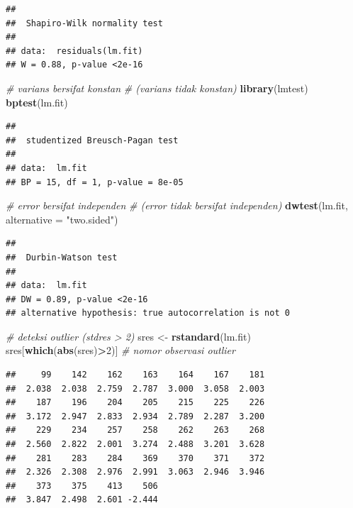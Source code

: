\documentclass[
]{book}
\newenvironment{Shaded}{\begin{snugshade}}{\end{snugshade}}
\newcommand{\AttributeTok}[1]{\textcolor[rgb]{0.13,0.29,0.53}{#1}}
\newcommand{\CommentTok}[1]{\textcolor[rgb]{0.56,0.35,0.01}{\textit{#1}}}
\newcommand{\DecValTok}[1]{\textcolor[rgb]{0.00,0.00,0.81}{#1}}
\newcommand{\FunctionTok}[1]{\textcolor[rgb]{0.13,0.29,0.53}{\textbf{#1}}}
\newcommand{\NormalTok}[1]{#1}
\newcommand{\OtherTok}[1]{\textcolor[rgb]{0.56,0.35,0.01}{#1}}
\newcommand{\SpecialCharTok}[1]{\textcolor[rgb]{0.81,0.36,0.00}{\textbf{#1}}}
\newcommand{\StringTok}[1]{\textcolor[rgb]{0.31,0.60,0.02}{#1}}
\theoremstyle{definition}
\theoremstyle{definition}
\theoremstyle{definition}
\theoremstyle{definition}
\theoremstyle{remark}
\begin{document}
\begin{verbatim}
## 
##  Shapiro-Wilk normality test
## 
## data:  residuals(lm.fit)
## W = 0.88, p-value <2e-16
\end{verbatim}

\begin{Shaded}
\begin{Highlighting}[]
\CommentTok{\# varians bersifat konstan }
\CommentTok{\# (varians tidak konstan)}
\FunctionTok{library}\NormalTok{(lmtest)}
\FunctionTok{bptest}\NormalTok{(lm.fit)}
\end{Highlighting}
\end{Shaded}

\begin{verbatim}
## 
##  studentized Breusch-Pagan test
## 
## data:  lm.fit
## BP = 15, df = 1, p-value = 8e-05
\end{verbatim}

\begin{Shaded}
\begin{Highlighting}[]
\CommentTok{\# error bersifat independen}
\CommentTok{\# (error tidak bersifat independen)}
\FunctionTok{dwtest}\NormalTok{(lm.fit, }\AttributeTok{alternative =} \StringTok{"two.sided"}\NormalTok{)}
\end{Highlighting}
\end{Shaded}

\begin{verbatim}
## 
##  Durbin-Watson test
## 
## data:  lm.fit
## DW = 0.89, p-value <2e-16
## alternative hypothesis: true autocorrelation is not 0
\end{verbatim}

\begin{Shaded}
\begin{Highlighting}[]
\CommentTok{\# deteksi outlier (stdres \textgreater{} 2)}
\NormalTok{sres }\OtherTok{\textless{}{-}} \FunctionTok{rstandard}\NormalTok{(lm.fit)}
\NormalTok{sres[}\FunctionTok{which}\NormalTok{(}\FunctionTok{abs}\NormalTok{(sres)}\SpecialCharTok{\textgreater{}}\DecValTok{2}\NormalTok{)] }\CommentTok{\# nomor observasi outlier}
\end{Highlighting}
\end{Shaded}

\begin{verbatim}
##     99    142    162    163    164    167    181 
##  2.038  2.038  2.759  2.787  3.000  3.058  2.003 
##    187    196    204    205    215    225    226 
##  3.172  2.947  2.833  2.934  2.789  2.287  3.200 
##    229    234    257    258    262    263    268 
##  2.560  2.822  2.001  3.274  2.488  3.201  3.628 
##    281    283    284    369    370    371    372 
##  2.326  2.308  2.976  2.991  3.063  2.946  3.946 
##    373    375    413    506 
##  3.847  2.498  2.601 -2.444
\end{verbatim}
\end{document}
